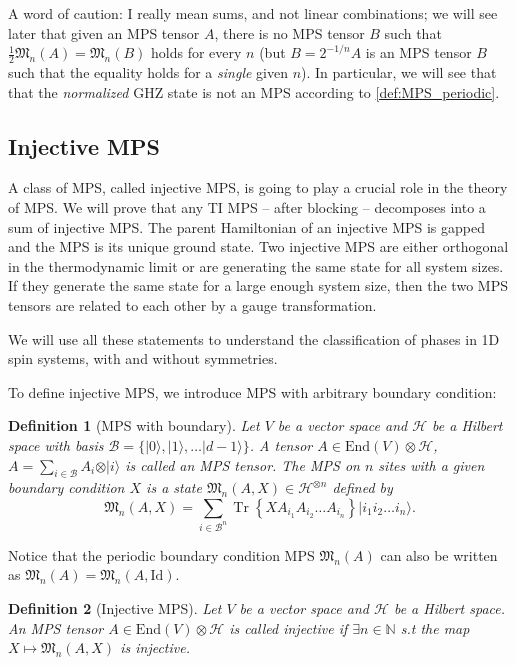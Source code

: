 \documentclass{article}
\newtheorem{definition}{Definition}
\newcommand{\tr}{\operatorname{Tr}}
\newcommand{\id}{\mathrm{Id}}
\newcommand{\End}{\mathrm{End}}
\newcommand{\ket}[1]{\vert #1 \rangle}
\begin{document}
A word of caution: I really mean sums, and not linear combinations; we will see later that given an MPS tensor $A$, there is no MPS tensor $B$ such that $\tfrac{1}{2}\mathfrak{M}_n(A) = \mathfrak{M}_n(B)$ holds for every $n$ (but $B = 2^{-1/n} A$ is an MPS tensor $B$ such that the equality holds for a \emph{single} given $n$). In particular, we will see that that the \emph{normalized} GHZ state is not an MPS according to \cref{def:MPS_periodic}.



\subsection{Injective MPS}

A class of MPS, called injective MPS, is going to play a crucial role in the theory of MPS. We will prove that any TI MPS -- after blocking -- decomposes into a sum of injective MPS. The parent Hamiltonian of an injective MPS is gapped and the MPS is its unique ground state. Two injective MPS are either orthogonal in the thermodynamic limit or are generating the same state for all system sizes. If they generate the same state for a large enough system size, then the two MPS tensors are related to each other by a gauge transformation. 

We will use all these statements to understand the classification of phases in 1D spin systems, with and without symmetries. 

To define injective MPS, we introduce MPS with arbitrary boundary condition:
\begin{definition}[MPS with boundary]\label{def:MPS_boundary}
  Let $V$ be a vector space and $\mathcal{H}$ be a Hilbert space with basis $\mathcal{B} = \{\ket{0},\ket{1},\dots \ket{d-1}\}$. A tensor $A\in \End(V)\otimes \mathcal{H}$, $A = \sum_{i\in \mathcal{B}} A_i \otimes \ket{i}$ is called an MPS tensor. The MPS on $n$ sites with a given boundary condition $X$ is a state $\mathfrak{M}_n(A,X)\in \mathcal{H}^{\otimes n}$ defined by
  \begin{equation*}
    \mathfrak{M}_n(A,X) = \sum_{i\in \mathcal{B}^n} \tr\left\{XA_{i_1} A_{i_2} \dots A_{i_n}\right\} \ket{i_1 i_2 \dots i_n}.
  \end{equation*}
\end{definition}

Notice that the periodic boundary condition MPS $\mathfrak{M}_n(A)$ can also be written as $\mathfrak{M}_n(A) = \mathfrak{M}_n(A,\id)$.

\begin{definition}[Injective MPS]
  Let $V$ be a vector space and $\mathcal{H}$ be a Hilbert space. An MPS tensor $A\in \End(V)\otimes \mathcal{H}$ is called \emph{injective} if $\exists n\in\mathbb{N}$ s.t the map $X\mapsto \mathfrak{M}_n(A,X)$ is injective.
\end{definition}
\end{document}
